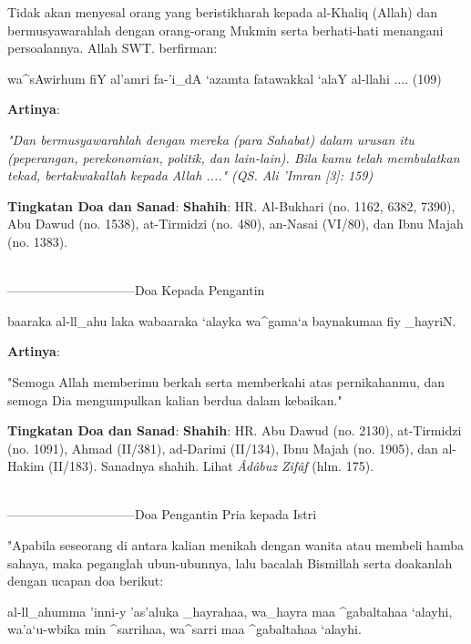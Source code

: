 \documentclass[a4paper,12pt]{article}
\begin{document}
\indent
Tidak akan menyesal orang yang beristikharah kepada al-Khaliq (Allah) dan 
bermusyawarahlah dengan orang-orang Mukmin serta berhati-hati menangani 
persoalannya. Allah SWT. berfirman:\\
\begin{arabtext}
\noindent
wa^sAwirhum fiY al'amri fa-'i_dA `azamta fatawakkal `alaY al-llahi .... 
(109)\\
\end{arabtext}
\noindent
\textbf{Artinya}:
\par
\indent
\textit{"Dan bermusyawarahlah dengan mereka (para Sahabat) dalam urusan itu 
(peperangan, perekonomian, politik, dan lain-lain). Bila kamu telah 
membulatkan tekad, bertakwakallah kepada Allah ...." (QS. Ali 'Imran 
[3]: 159)}\\
\par
\noindent
\textbf{Tingkatan Doa dan Sanad}: \textbf{Shahih}: HR. Al-Bukhari (no. 
1162, 6382, 7390), Abu Dawud (no. 1538), at-Tirmidzi (no. 480), an-Nasai 
(VI/80), dan Ibnu Majah (no. 1383).\\\\
\par
{}------------------------------Doa Kepada Pengantin
\begin{arabtext}
\noindent
baaraka al-ll_ahu laka wabaaraka `alayka wa^gama`a baynakumaa fiy _hayriN.\\
\end{arabtext}
\noindent
\textbf{Artinya}:
\par
\indent
"Semoga Allah memberimu berkah serta memberkahi atas pernikahanmu, dan 
semoga Dia mengumpulkan kalian berdua dalam kebaikan."\\
\par
\noindent
\textbf{Tingkatan Doa dan Sanad}: \textbf{Shahih}: HR. Abu Dawud (no. 
2130), at-Tirmidzi (no. 1091), Ahmad (II/381), ad-Darimi (II/134), Ibnu 
Majah (no. 1905), dan al-Hakim (II/183). Sanadnya shahih. Lihat 
\textit{\^{A}d\^{a}buz Zif\^{a}f} (hlm. 175).\\\\
\par
{}------------------------------Doa Pengantin Pria kepada Istri
\par
\indent
"Apabila seseorang di antara kalian menikah dengan wanita atau membeli 
hamba sahaya, maka peganglah ubun-ubunnya, lalu bacalah Bismillah serta 
doakanlah dengan ucapan doa berikut:\\
\begin{arabtext}
\noindent
al-ll_ahumma 'inni-y 'as'aluka _hayrahaa, wa_hayra maa ^gabaltahaa `alayhi, 
wa'a`u-wbika min ^sarrihaa, wa^sarri maa ^gabaltahaa `alayhi.\\
\end{arabtext}
\end{document}

